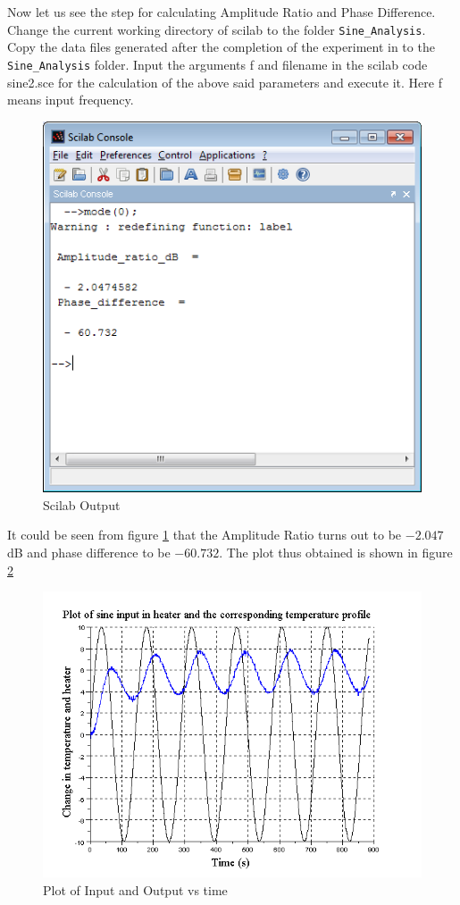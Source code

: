 Now let us see the step for calculating Amplitude Ratio and Phase Difference. Change the current working directory of scilab to the folder {\tt Sine\_Analysis}. Copy the data files generated after the completion of the experiment in to the {\tt Sine\_Analysis} folder. Input the arguments {\ttfamily f} and {\ttfamily filename} in the scilab code {\ttfamily sine2.sce} for the calculation of the above said parameters and execute it.  Here {\ttfamily f} means input frequency.
\begin{figure}
\includegraphics[width=\linewidth]{sinetest_manual/bode_calc.png}
\caption{Scilab Output}
\label{scilab_op}
\end{figure}
It could be seen from figure \ref{scilab_op} that the Amplitude Ratio turns out to be $-2.047$dB and phase difference to be $-60.732$\textdegree.
The plot thus obtained is shown in figure \ref{plot0.4}
\begin{figure}
\includegraphics[width=\linewidth]{sinetest_manual/bode_resp}
\caption{Plot of Input and Output vs time}
\label{plot0.4}
\end{figure}

